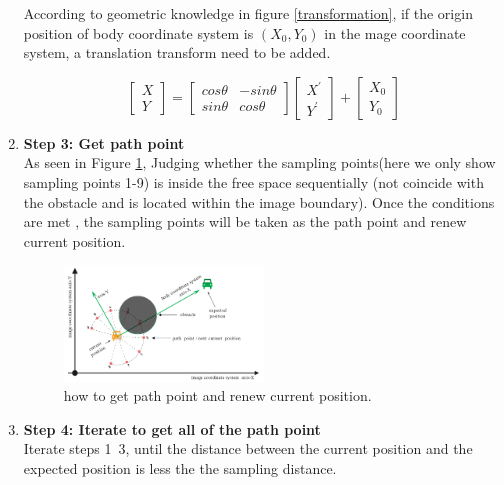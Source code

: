\begin{enumerate}
    According to geometric knowledge in figure \ref{transformation}, 
    if the origin position of body coordinate system is $(X_{0},Y_{0})$ in the mage coordinate system, a translation transform need to be added.
    
    \begin{equation}
    \begin{bmatrix}
    X \\Y
    \end{bmatrix}
    = 
    \begin{bmatrix}
    cos\theta & -sin\theta \\sin\theta & cos\theta
    \end{bmatrix} 
    \begin{bmatrix}
    X^{'}\\Y^{'}
    \end{bmatrix} 
    +\begin{bmatrix}
    X_{0}\\Y_{0}
    \end{bmatrix}  
    \end{equation}

    
    \item \textbf{Step 3: Get path point}\\
   As seen in Figure \ref{UpdatePathPoint}, Judging whether the sampling points(here we only show sampling points 1-9) is inside the free space sequentially (not coincide with the obstacle and is located within the image boundary). Once the conditions are met , the sampling points will be taken as the path point and renew current position.
   
        \begin{figure}[thb]
        \centering
        \includegraphics[width=0.5\textwidth]{images/PathPlaningUpdatePathPoint.png}
        \caption[how to get path point and renew current position]{how to get path point and renew current position.}\label{UpdatePathPoint}
    \end{figure}
    
    \item \textbf{Step 4: Iterate to get all of the path point}\\
    Iterate steps 1~3, until the distance between the current position and the expected position is less the the sampling distance.
\end{enumerate}

